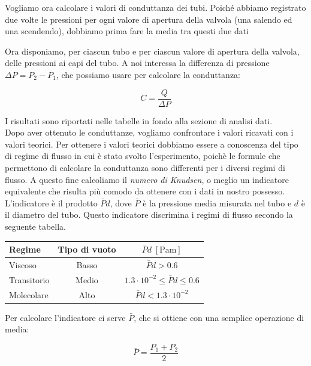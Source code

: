 Vogliamo ora calcolare i valori di conduttanza dei tubi. Poiché abbiamo registrato due volte le pressioni per ogni valore
di apertura della valvola (una salendo ed una scendendo), dobbiamo prima fare la media tra questi due dati

Ora disponiamo, per ciascun tubo e per ciascun valore di apertura della valvola, delle pressioni ai capi del tubo.
A noi interessa la differenza di pressione $\Delta P = P_2 - P_1$, che possiamo usare per calcolare la conduttanza:

\begin{equation}
    C = \frac{Q}{\Delta P}
\end{equation}

I risultati sono riportati nelle tabelle in fondo alla sezione di analisi dati.\\
Dopo aver ottenuto le conduttanze, vogliamo confrontare i valori ricavati con i valori teorici.
Per ottenere i valori teorici dobbiamo essere a conoscenza del tipo di regime di flusso in cui è stato svolto l'esperimento,
poichè le formule che permettono di calcolare la conduttanza sono differenti per i diversi regimi di flusso.
A questo fine calcoliamo il \emph{numero di Knudsen}, o meglio un indicatore equivalente che risulta più comodo da
ottenere con i dati in nostro possesso. L'indicatore è il prodotto $\bar{P}d$, dove $\bar{P}$ è la pressione media misurata nel
tubo e $d$ è il diametro del tubo. Questo indicatore discrimina i regimi di flusso secondo la seguente tabella.

\begin{center}
    \begin{tabular}{l c c}
        \toprule
        Regime & Tipo di vuoto & $\bar{P} d \; [\si{\pascal\metre}]$ \\
        \midrule
        Viscoso & Basso & $\bar{P} d > 0.6$ \\
        Transitorio & Medio & $1.3\cdot10^{-2} \le \bar{P} d \le 0.6$ \\
        Molecolare & Alto & $\bar{P} d < 1.3\cdot10^{-2}$ \\
        \bottomrule
    \end{tabular}
\end{center}

Per calcolare l'indicatore ci serve $\bar{P}$, che si ottiene con una semplice operazione di media:

\begin{equation}
    \bar{P} = \frac{P_1 + P_2}{2}
\end{equation}

